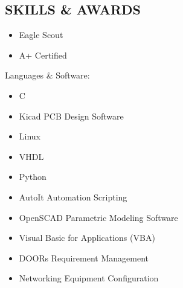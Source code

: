 \documentclass[line,mmmargin]{res}
\begin{document}
\begin{resume}
\section{SKILLS \& AWARDS} 
		\begin{multicols}{2}
			\begin{itemize}
				\itemsep -2pt
				\item[] Eagle Scout
				\item[] A+ Certified
			\end{itemize}
		\end{multicols}
	\vspace{-10pt}
	{Languages \& Software:} %
		\begin{multicols}{2}
			\begin{itemize}
				\itemsep -2pt
				\item[] C
				\item[] Kicad PCB Design Software
				\item[] Linux
				\item[] VHDL
				\item[] Python
				\item[] AutoIt Automation Scripting
				\item[] OpenSCAD Parametric Modeling Software
				\item[] Visual Basic for Applications (VBA)
				\item[] DOORs Requirement Management
				\item[] Networking Equipment Configuration


\end{itemize}
\end{multicols}
\end{resume}
\end{document}
